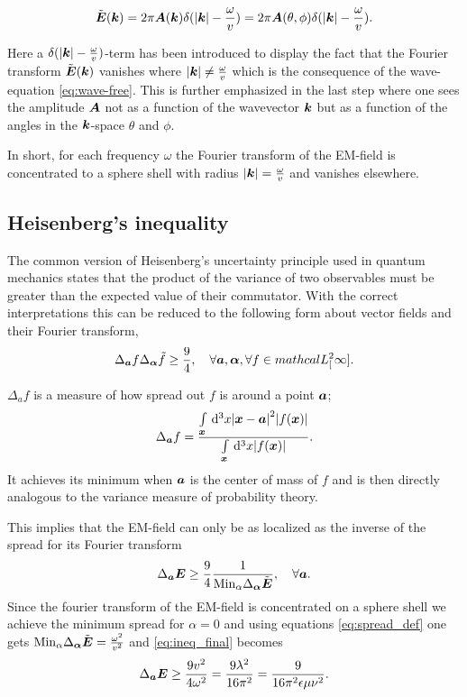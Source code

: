 \documentclass[11pt,a4paper, 
english, swedish %
]{article}
\newcommand{\Lsq}[1]{\ensuremath{mathcal{L}^2_{#1}}}
\begin{document}
\begin{equation}
  \label{eq:f-transf}
  \tilde{\vb*E}(\vb*k)=2\pi\vb*A(\vb*k)\delta(\abs{\vb*k}-\frac{\omega}{v})=2\pi\vb*A(\theta,\phi)\delta(\abs{\vb*k}-\frac{\omega}{v}).
\end{equation}

Here a $\delta(\abs{\vb*k}-\frac{\omega}{v})$-term has been introduced to display the fact that the Fourier transform $\tilde{\vb*E}(\vb*k)$ vanishes where $\abs{\vb*k} \neq\frac{\omega}{v}$ which is the consequence of the wave-equation \ref{eq:wave-free}.
This is further emphasized in the last step where one sees the amplitude $\vb*A$ not as a function of the wavevector $\vb*k$ but as a function of the angles in the $\vb*k$-space $\theta$ and $\phi$.

In short, for each frequency $\omega$ the Fourier transform of the EM-field is concentrated to a sphere shell with radius $\abs{\vb*k}=\frac{\omega}{v}$ and vanishes elsewhere.

\subsection{Heisenberg's inequality}
The common version of Heisenberg's uncertainty principle used in quantum mechanics states that the product of the variance of two observables must be greater than the expected value of their commutator. With the correct interpretations this can be reduced to the following form about vector fields and their Fourier transform, 
\begin{equation}
\Delta_{\vb*a}f \Delta_{\vb*\alpha} \tilde{f} \geq \frac{9}{4}, \quad \forall \vb*a, \vb*\alpha, \forall f \in \Lsq[\infty].
\end{equation}

$\Delta_af$ is a measure of how spread out $f$ is around a point $\vb*a$;
\begin{equation}
  \label{eq:spread_def}
\Delta_{\vb*a}f=\frac{\int_{\vb*x}\id^3x\abs{\vb*x-\vb*a}^2\abs{f(\vb*x)}}{\int_{\vb*x}\id^3x\abs{f(\vb*x)}}.
\end{equation}
It achieves its minimum when $\vb*a$ is the center of mass of $f$ and is then directly analogous to the variance measure of probability theory.

This implies that the EM-field can only be as localized as the inverse of the spread for its Fourier transform
\begin{equation}
  \label{eq:ineq_final}
  \Delta_{\vb*a}\vb*E\geq \frac{9}{4} \frac{1}{\mathrm{Min}_\alpha\Delta_{\vb*\alpha}\tilde{\vb*E}}, \quad \forall \vb*a.
\end{equation}
Since the fourier transform of the EM-field is concentrated on a sphere shell we achieve the minimum spread for $\alpha=0$ and using equations \ref{eq:spread_def} one gets
$\mathrm{Min}_\alpha\Delta_{\vb*\alpha}\tilde{\vb*E}=\frac{\omega^2}{v^2}$ and \ref{eq:ineq_final} becomes
\begin{equation}
 \Delta_{\vb*a}\vb*E\geq \frac{9v^2}{4\omega^2}=\frac{9\lambda^2}{16\pi^2}=\frac{9}{16\pi^2\epsilon\mu\nu^2}.
 \end{equation}
\end{document}
